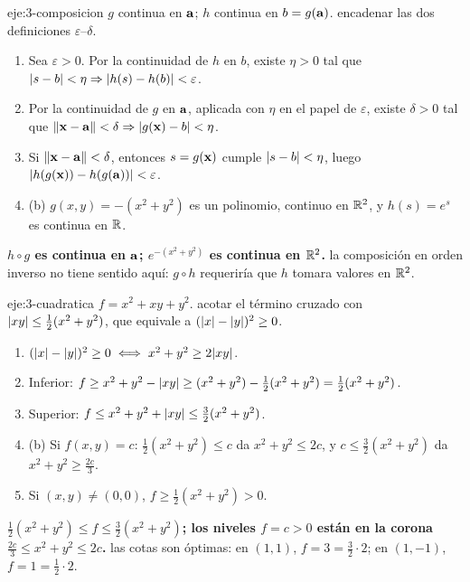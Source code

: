 \begin{solucion}{eje:3-composicion}
\datos $g$ continua en $\mathbf{a}$; $h$ continua en $b=g(\mathbf{a})$.
\planteamiento encadenar las dos definiciones $\varepsilon$--$\delta$.
\pasos
\begin{enumerate}[label=\arabic*.]
  \item Sea $\varepsilon>0$. Por la continuidad de $h$ en $b$, existe $\eta>0$ tal que $\lvert s-b\rvert<\eta\Rightarrow\lvert h(s)-h(b)\rvert<\varepsilon$.
  \item Por la continuidad de $g$ en $\mathbf{a}$, aplicada con $\eta$ en el papel de $\varepsilon$, existe $\delta>0$ tal que $\lVert\mathbf{x}-\mathbf{a}\rVert<\delta\Rightarrow\lvert g(\mathbf{x})-b\rvert<\eta$.
  \item Si $\lVert\mathbf{x}-\mathbf{a}\rVert<\delta$, entonces $s=g(\mathbf{x})$ cumple $\lvert s-b\rvert<\eta$, luego $\lvert h(g(\mathbf{x}))-h(g(\mathbf{a}))\rvert<\varepsilon$.
  \item (b) $g(x,y)=-(x^2+y^2)$ es un polinomio, continuo en $\mathbb{R}^2$, y $h(s)=e^s$ es continua en $\mathbb{R}$.
\end{enumerate}
\resultado \textbf{$h\circ g$ es continua en $\mathbf{a}$; $e^{-(x^2+y^2)}$ es continua en $\mathbb{R}^2$.}
\comprobacion la composición en orden inverso no tiene sentido aquí: $g\circ h$ requeriría que $h$ tomara valores en $\mathbb{R}^2$.
\end{solucion}

\begin{solucion}{eje:3-cuadratica}
\datos $f=x^2+xy+y^2$.
\planteamiento acotar el término cruzado con $\lvert xy\rvert\le\frac12(x^2+y^2)$, que equivale a $(\lvert x\rvert-\lvert y\rvert)^2\ge0$.
\pasos
\begin{enumerate}[label=\arabic*.]
  \item $(\lvert x\rvert-\lvert y\rvert)^2\ge0\iff x^2+y^2\ge2\lvert xy\rvert$.
  \item Inferior: $f\ge x^2+y^2-\lvert xy\rvert\ge(x^2+y^2)-\frac12(x^2+y^2)=\frac12(x^2+y^2)$.
  \item Superior: $f\le x^2+y^2+\lvert xy\rvert\le\frac32(x^2+y^2)$.
  \item (b) Si $f(x,y)=c$: $\frac12(x^2+y^2)\le c$ da $x^2+y^2\le2c$, y $c\le\frac32(x^2+y^2)$ da $x^2+y^2\ge\frac{2c}{3}$.
  \item Si $(x,y)\neq(0,0)$, $f\ge\frac12(x^2+y^2)>0$.
\end{enumerate}
\resultado \textbf{$\frac12(x^2+y^2)\le f\le\frac32(x^2+y^2)$; los niveles $f=c>0$ están en la corona $\frac{2c}{3}\le x^2+y^2\le2c$.}
\comprobacion las cotas son óptimas: en $(1,1)$, $f=3=\frac32\cdot2$; en $(1,-1)$, $f=1=\frac12\cdot2$.
\end{solucion}

